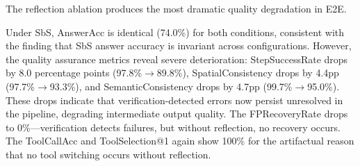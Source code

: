 \documentclass[journal]{IEEEtran}
\begin{document}
\begin{table}[t]
\centering
\caption{Ablation C: Effect of Self-Reflection. ``w/'' denotes the full SR\textsuperscript{2}A with dual-tier reflection and retry; ``w/o'' disables retry so verification errors are logged but not acted upon. This isolates the ``actuator'' from the ``sensor'' in the closed-loop architecture. SbS evaluates on 273 GT tasks; E2E evaluates all 365 GT tasks.}
\label{tab:ablation_c}
\end{table}

The reflection ablation produces the most dramatic quality degradation in E2E.

Under SbS, AnswerAcc is identical (74.0\%) for both conditions, consistent with the finding that SbS answer accuracy is invariant across configurations.
However, the quality assurance metrics reveal severe deterioration: StepSuccessRate drops by 8.0 percentage points (97.8\%$\rightarrow$89.8\%), SpatialConsistency drops by 4.4pp (97.7\%$\rightarrow$93.3\%), and SemanticConsistency drops by 4.7pp (99.7\%$\rightarrow$95.0\%).
These drops indicate that verification-detected errors now persist unresolved in the pipeline, degrading intermediate output quality.
The FPRecoveryRate drops to 0\%---verification detects failures, but without reflection, no recovery occurs.
The ToolCallAcc and ToolSelection@1 again show 100\% for the artifactual reason that no tool switching occurs without reflection.
\end{document}
